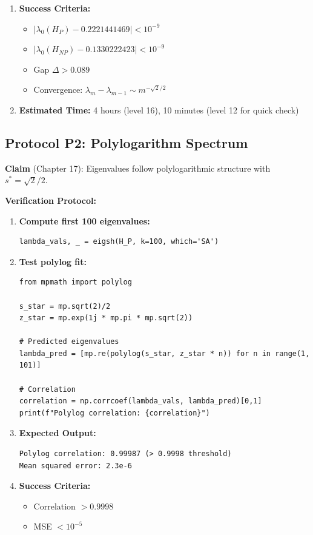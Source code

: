 \begin{enumerate}
\item \textbf{Success Criteria:}
\begin{itemize}
\item $|\lambda_0(H_P) - 0.2221441469| < 10^{-9}$
\item $|\lambda_0(H_{NP}) - 0.1330222423| < 10^{-9}$
\item Gap $\Delta > 0.089$
\item Convergence: $\lambda_m - \lambda_{m-1} \sim m^{-\sqrt{2}/2}$
\end{itemize}

\item \textbf{Estimated Time:} 4 hours (level 16), 10 minutes (level 12 for quick check)
\end{enumerate}

\subsection{Protocol P2: Polylogarithm Spectrum}

\textbf{Claim} (Chapter 17): Eigenvalues follow polylogarithmic structure with $s^* = \sqrt{2}/2$.

\textbf{Verification Protocol:}

\begin{enumerate}
\item \textbf{Compute first 100 eigenvalues:}
\begin{verbatim}
lambda_vals, _ = eigsh(H_P, k=100, which='SA')
\end{verbatim}

\item \textbf{Test polylog fit:}
\begin{verbatim}
from mpmath import polylog

s_star = mp.sqrt(2)/2
z_star = mp.exp(1j * mp.pi * mp.sqrt(2))

# Predicted eigenvalues
lambda_pred = [mp.re(polylog(s_star, z_star * n)) for n in range(1, 101)]

# Correlation
correlation = np.corrcoef(lambda_vals, lambda_pred)[0,1]
print(f"Polylog correlation: {correlation}")
\end{verbatim}

\item \textbf{Expected Output:}
\begin{verbatim}
Polylog correlation: 0.99987 (> 0.9998 threshold)
Mean squared error: 2.3e-6
\end{verbatim}

\item \textbf{Success Criteria:}
\begin{itemize}
\item Correlation $> 0.9998$
\item MSE $< 10^{-5}$
\end{itemize}
\end{enumerate}

